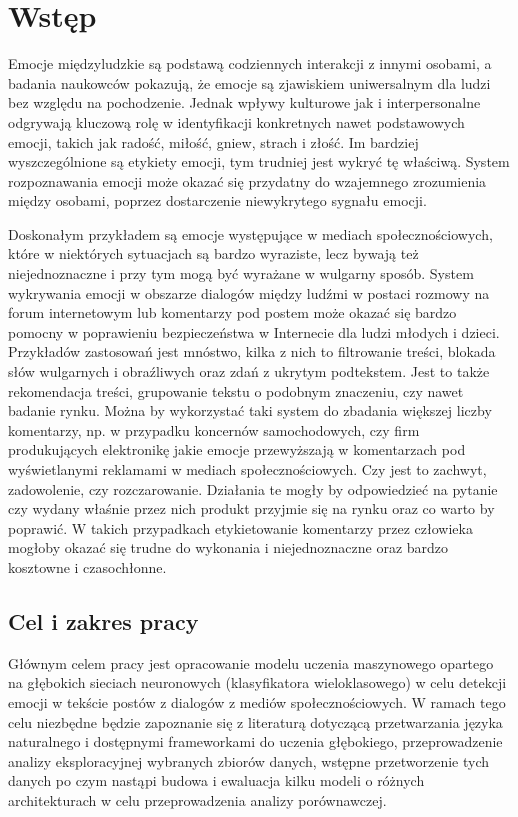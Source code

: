 \chapter{Wstęp}

Emocje międzyludzkie są podstawą codziennych interakcji z innymi osobami, a badania naukowców pokazują, że emocje są zjawiskiem uniwersalnym dla ludzi bez względu na pochodzenie. Jednak wpływy kulturowe jak i interpersonalne odgrywają kluczową rolę w identyfikacji konkretnych nawet podstawowych emocji, takich jak radość, miłość, gniew, strach i złość. Im bardziej wyszczególnione są etykiety emocji, tym trudniej jest wykryć tę właściwą. System rozpoznawania emocji może okazać się przydatny do wzajemnego zrozumienia między osobami, poprzez dostarczenie niewykrytego sygnału emocji. 

Doskonałym przykładem są emocje występujące w mediach społecznościowych, które w niektórych sytuacjach są bardzo wyraziste, lecz bywają też niejednoznaczne i przy tym mogą być wyrażane w wulgarny sposób. System wykrywania emocji w obszarze dialogów między ludźmi w postaci rozmowy na forum internetowym lub komentarzy pod postem może okazać się bardzo pomocny w poprawieniu bezpieczeństwa w Internecie dla ludzi młodych i dzieci. Przykładów zastosowań jest mnóstwo, kilka z nich to filtrowanie treści, blokada słów wulgarnych i obraźliwych oraz zdań z ukrytym podtekstem. Jest to także rekomendacja treści, grupowanie tekstu o podobnym znaczeniu, czy nawet badanie rynku. Można by wykorzystać taki system do zbadania większej liczby komentarzy, np. w przypadku koncernów samochodowych, czy firm produkujących elektronikę jakie emocje przewyższają w komentarzach pod wyświetlanymi reklamami w mediach społecznościowych. Czy jest to zachwyt, zadowolenie, czy rozczarowanie. Działania te mogły by odpowiedzieć na pytanie czy wydany właśnie przez nich produkt przyjmie się na rynku oraz co warto by poprawić. W takich przypadkach etykietowanie komentarzy przez człowieka mogłoby okazać się trudne do wykonania i niejednoznaczne oraz bardzo kosztowne i czasochłonne.

\section{Cel i zakres pracy}

Głównym celem pracy jest opracowanie modelu uczenia maszynowego opartego na głębokich sieciach neuronowych (klasyfikatora wieloklasowego) w celu detekcji emocji w tekście postów z dialogów z mediów społecznościowych. W ramach tego celu niezbędne będzie zapoznanie się z literaturą dotyczącą przetwarzania języka naturalnego i dostępnymi frameworkami do uczenia głębokiego, przeprowadzenie analizy eksploracyjnej wybranych zbiorów danych, wstępne przetworzenie tych danych po czym nastąpi budowa i ewaluacja kilku modeli o różnych architekturach w celu przeprowadzenia analizy porównawczej.


